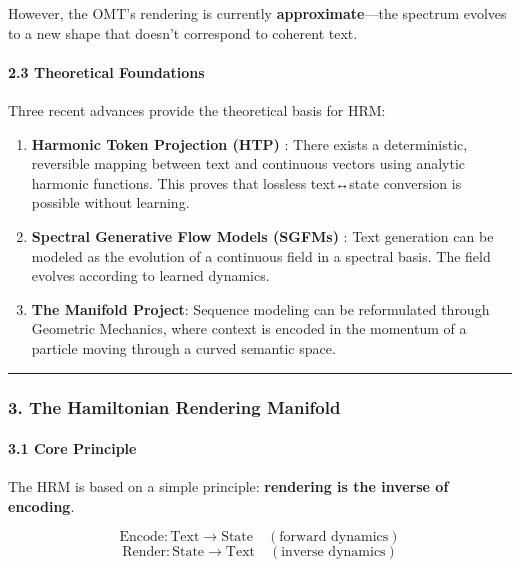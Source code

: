 \documentclass[
  11pt,
  a4paper,
]{article}
\begin{document}
However, the OMT's rendering is currently \textbf{approximate}---the
spectrum evolves to a new shape that doesn't correspond to coherent
text.

\paragraph{2.3 Theoretical Foundations}\label{theoretical-foundations}

Three recent advances provide the theoretical basis for HRM:

\begin{enumerate}
\def\labelenumi{\arabic{enumi}.}
\item
  \textbf{Harmonic Token Projection (HTP)} : There exists a
  deterministic, reversible mapping between text and continuous vectors
  using analytic harmonic functions. This proves that lossless
  text↔state conversion is possible without learning.
\item
  \textbf{Spectral Generative Flow Models (SGFMs)} : Text generation can
  be modeled as the evolution of a continuous field in a spectral basis.
  The field evolves according to learned dynamics.
\item
  \textbf{The Manifold Project}: Sequence modeling can be reformulated
  through Geometric Mechanics, where context is encoded in the momentum
  of a particle moving through a curved semantic space.
\end{enumerate}

\begin{center}\rule{0.5\linewidth}{0.5pt}\end{center}

\subsubsection{3. The Hamiltonian Rendering
Manifold}\label{the-hamiltonian-rendering-manifold}

\paragraph{3.1 Core Principle}\label{core-principle}

The HRM is based on a simple principle: \textbf{rendering is the inverse
of encoding}.

\[
\text{Encode}: \text{Text} \rightarrow \text{State} \quad (\text{forward dynamics})
\] \[
\text{Render}: \text{State} \rightarrow \text{Text} \quad (\text{inverse dynamics})
\]
\end{document}
